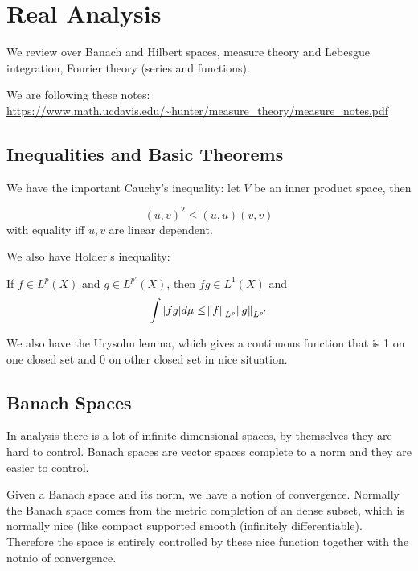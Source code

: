 \documentclass[main.tex]{subfiles}
\begin{document}
\section{Real Analysis}

We review over Banach and Hilbert spaces, measure theory and Lebesgue integration, Fourier theory (series and functions). 

We are following these notes: \url{https://www.math.ucdavis.edu/~hunter/measure_theory/measure_notes.pdf}


\subsection{Inequalities and Basic Theorems}

We have the important Cauchy's inequality:
let $V$ be an inner product space, then 
\begin{theorem}
$$(u,v)^2 \leq (u,u) (v,v)$$
with equality iff $u,v$ are linear dependent.
\end{theorem}

We also have Holder's inequality:

\begin{theorem}
If $f \in L^p(X)$ and $g \in L^{p'}(X)$, then $fg \in L^1(X)$ and 
$$
\int |fg| d\mu \leq \norm{f}_{L^p}\norm{g}_{L^{p'}}
$$
\end{theorem}

We also have the Urysohn lemma, which gives a continuous function that is 1 on one closed set and 0 on other closed set in nice situation.

\subsection{Banach Spaces}
In analysis there is a lot of infinite dimensional spaces, by themselves they are hard to control. Banach spaces are vector spaces complete to a norm and they are easier to control. 

\begin{remark}
Given a Banach space and its norm, we have a notion of convergence. Normally the Banach space comes from the metric completion of an dense subset, which is normally nice (like compact supported smooth (infinitely differentiable). Therefore the space is entirely controlled by these nice function together with the notnio of convergence.
\end{remark}
\end{document}
